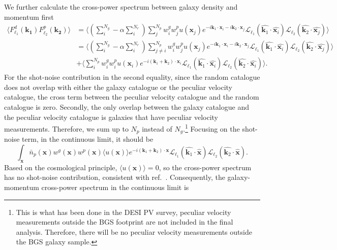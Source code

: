 \documentclass[a4paper,11pt]{article}
\begin{document}
We further calculate the cross-power spectrum between galaxy density and momentum first
\begin{align}
    \langle F_{\ell_1}^d (\boldsymbol{k_1}) F_{\ell_2}^p (\boldsymbol{k_2})\rangle &= \langle (\sum_i^{N_g} - \alpha\sum_i^{N_r})\sum_j^{N_p} w_i^g w_j^p u(\boldsymbol{x}_j) e^{-i \boldsymbol{k}_1\cdot\boldsymbol{x}_i - i\boldsymbol{k}_2\cdot\boldsymbol{x}_j} \mathcal{L}_{\ell_1}(\hat{\boldsymbol{k}_1}\cdot\hat{\boldsymbol{x}_i}) \mathcal{L}_{\ell_2}(\hat{\boldsymbol{k}_2}\cdot\hat{\boldsymbol{x}_j})\rangle \nonumber \\
    &=\langle (\sum_i^{N_g} - \alpha\sum_i^{N_r})\sum_{j \neq i}^{N_p} w_i^g w_j^p u(\boldsymbol{x}_j) e^{-i \boldsymbol{k}_1\cdot\boldsymbol{x}_i - i\boldsymbol{k}_2\cdot\boldsymbol{x}_j} \mathcal{L}_{\ell_1}(\hat{\boldsymbol{k}_1}\cdot\hat{\boldsymbol{x}_i}) \mathcal{L}_{\ell_2}(\hat{\boldsymbol{k}_2}\cdot\hat{\boldsymbol{x}_j})\rangle \nonumber \\
    &+\langle \sum_i^{N_p}w_i^g w_i^p u(\boldsymbol{x}_i) e^{-i (\boldsymbol{k}_1+\boldsymbol{k}_2)\cdot\boldsymbol{x}_i} \mathcal{L}_{\ell_1}(\hat{\boldsymbol{k}_1}\cdot\hat{\boldsymbol{x}_i}) \mathcal{L}_{\ell_2}(\hat{\boldsymbol{k}_2}\cdot\hat{\boldsymbol{x}_i})\rangle.
\end{align}
For the shot-noise contribution in the second equality, since the random catalogue does not overlap with either the galaxy catalogue or the peculiar velocity catalogue, the cross term between the peculiar velocity catalogue and the random catalogue is zero. Secondly, the only overlap between the galaxy catalogue and the peculiar velocity catalogue is galaxies that have peculiar velocity measurements. Therefore, we sum up to \(N_p\) instead of \(N_g\).\footnote{This is what has been done in the DESI PV survey, peculiar velocity measurements outside the BGS footprint are not included in the final analysis. Therefore, there will be no peculiar velocity measurements outside the BGS galaxy sample.} Focusing on the shot-noise term, in the continuous limit, it should be 
\begin{equation}
    \int_{\boldsymbol{x}} \bar{n}_p(\boldsymbol{x}) w^g(\boldsymbol{x})w^p(\boldsymbol{x}) \langle u(\boldsymbol{x}) \rangle e^{-i (\boldsymbol{k}_1+\boldsymbol{k}_2)\cdot\boldsymbol{x}} \mathcal{L}_{\ell_1}(\hat{\boldsymbol{k}_1}\cdot\hat{\boldsymbol{x}}) \mathcal{L}_{\ell_2}(\hat{\boldsymbol{k}_2}\cdot\hat{\boldsymbol{x}}).
\end{equation}
Based on the cosmological principle, \(\langle u(\boldsymbol{x}) \rangle = 0\), so the cross-power spectrum has no shot-noise contribution, consistent with ref.~\citep{Howlett_2019}. Consequently, the galaxy-momentum cross-power spectrum in the continuous limit is 
\end{document}
